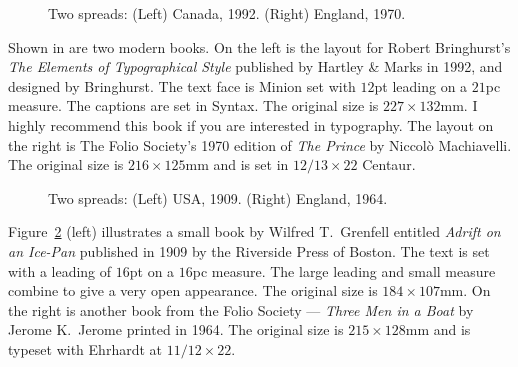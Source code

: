 \documentclass[10pt,letterpaper]{memoir}
\newlength{\pwlayi}\setlength{\pwlayi}{0.45\textwidth} %
\newlength{\pwlayii}\setlength{\pwlayii}{0.45\pwlayi}
\begin{document}
\begin{figure}
\centering
\begin{minipage}[b]{\pwlayi}
\end{minipage}
\hfill
\begin{minipage}[b]{\pwlayi}
\end{minipage}
\caption[Two spreads: Canada, 1992 and England, 1970]%
        {Two spreads: (Left) Canada, 1992. %
         (Right) England, 1970.} \label{fb:1}
\end{figure}

    Shown in  are two modern books. On the left is the layout
for Robert Bringhurst's \textit{The Elements of Typographical Style} published
by Hartley \& Marks in 1992, and designed by Bringhurst. The text face is
Minion set with $12$pt leading on a $21$pc measure. The captions are
set in Syntax. The original
size is $227 \times 132$mm. I highly recommend this book if you are
interested in typography. The layout on the right is The Folio Society's
1970 edition of \textit{The Prince} by Niccol\`{o} Machiavelli. The original
size is $216 \times 125$mm and is set in $12/13 \times 22$ Centaur.



\begin{figure}
\centering
\begin{minipage}[b]{\pwlayi}
\end{minipage}
\hfill
\begin{minipage}[b]{\pwlayi}
\end{minipage}
\caption[Two spreads: USA, 1909 and England, 1964.]%
        {Two spreads: (Left) USA, 1909.
         (Right) England, 1964.} \label{fb:2}
\end{figure}

    Figure~\ref{fb:2} (left) illustrates a small book by Wilfred T.~Grenfell
entitled \textit{Adrift on an Ice-Pan} published in 1909 by the Riverside
Press of Boston. The text is set with a leading of $16$pt on a $16$pc measure.
The large leading and small measure combine to give a very open appearance.
The original
size is $184 \times 107$mm. On the right is another book from the
Folio Society --- \textit{Three Men in a Boat} by Jerome K.~Jerome printed
in 1964. The original size is $215 \times 128$mm and is typeset with
Ehrhardt at $11/12 \times 22$.
\end{document}
